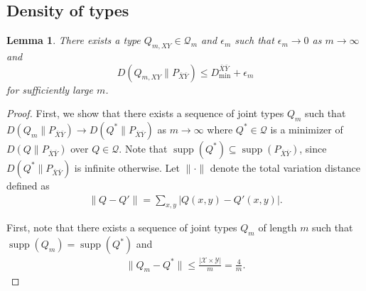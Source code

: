 \documentclass[journal,onecolumn]{IEEEtran}
\newtheorem{lemma}[theorem]{Lemma}
\theoremstyle{definition}
\theoremstyle{remark}
\newcommand{\Pbxby}{P_{\bar{X}\bar{Y}}}
\newcommand{\Dbxbymin}{D^{\bar{X}\bar{Y}}_\mathrm{min}}
\begin{document}
\subsection{Density of types}\label{prf:density of types}
    \begin{lemma}
        There exists a type $Q_{m,XY}\in\mathcal{Q}_m$ and $\epsilon_m$ such that
        $\epsilon_m\to 0$ as $m\to\infty$
        and 
        \begin{equation}\label{eq:density of types}
            D(Q_{m,XY}\|\Pbxby)
            \leq
            \Dbxbymin + \epsilon_m
        \end{equation}
        for sufficiently large $m$.
    \end{lemma}
    \begin{proof}
    First, we show that  there exists a sequence of joint types $Q_m$ such that $D(Q_m\|\Pbxby)\to D(Q^\ast\|\Pbxby)$ as $m\to\infty$ where
    $Q^\ast\in\mathcal{Q}$ is a minimizer of $D(Q\|\Pbxby)$ over $Q\in\mathcal{Q}$.
    Note that $\operatorname{supp}(Q^*) \subseteq \operatorname{supp}(\Pbxby)$,
    since $D(Q^*\|\Pbxby)$ is infinite otherwise.
    Let $\|\cdot\|$ denote the total variation distance defined as
    \begin{align*}
        \|Q-Q'\|
        =
        \sum_{x,y}
        |Q(x,y)-Q'(x,y)|.
    \end{align*}


    First, note that there exists a sequence of joint types $Q_m$ of length $m$ such that $\operatorname{supp}(Q_m)=\operatorname{supp}(Q^\ast)$ and
    \begin{align*}
        \|Q_m-Q^\ast\|
        \leq
        \frac{|\mathcal{X}\times\mathcal{Y}|}{m}=\frac{4}{m}.
    \end{align*}



\end{proof}
\end{document}
